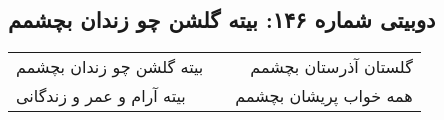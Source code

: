\begin{center}
\section*{دوبیتی شماره ۱۴۶: بیته گلشن چو زندان بچشمم}
\label{sec:146}
\begin{longtable}{l p{0.5cm} r}
بیته گلشن چو زندان بچشمم
&&
گلستان آذرستان بچشمم
\\
بیته آرام و عمر و زندگانی
&&
همه خواب پریشان بچشمم
\\
\end{longtable}
\end{center}
